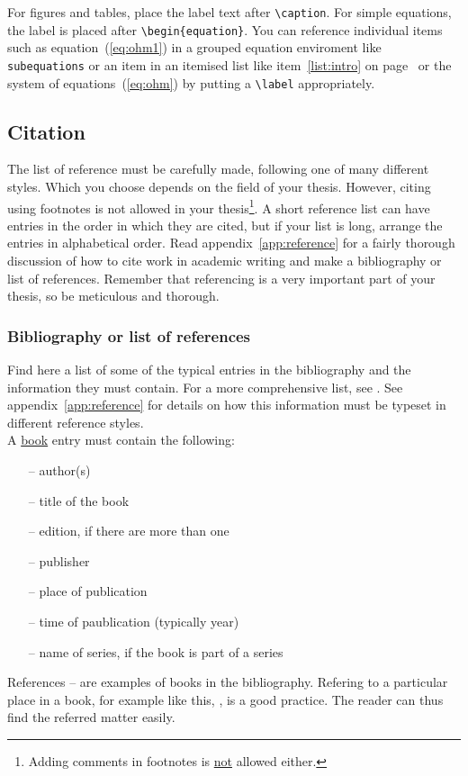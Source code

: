\documentclass[english, 12pt, a4paper, elec, utf8, a-2b, online]{aaltothesis}
\begin{document}
For figures and tables, place the label text after \verb+\caption+. For simple 
equations, the label is placed after \verb+\begin{equation}+. You can reference
individual items such as equation~(\ref{eq:ohm1}) in a grouped equation 
enviroment like \verb+subequations+ or an item in an itemised list like 
item~\ref{list:intro} on page~\pageref{list:intro} or the system of 
equations~(\ref{eq:ohm}) by putting a \verb+\label+ appropriately.

\subsection{Citation}

The list of reference must be carefully made, following one of many different 
styles. Which you choose depends on the field of your thesis. However, citing 
using footnotes is not allowed in your thesis\footnote{Adding comments in 
footnotes is \underline{not} allowed either.}. A short reference list can have 
entries in the order in which they are cited, but if your list is long, arrange 
the entries in alphabetical order. Read appendix~\ref{app:reference} for a 
fairly thorough discussion of how to cite work in academic writing and make a 
bibliography or list of references. Remember that referencing is a very 
important part of your thesis, so be meticulous and thorough.

\subsubsection{Bibliography or list of references}

Find here a list of some of the typical entries in the bibliography and the 
information they must contain. For a more comprehensive list, see 
\cite{aaltolib}. See appendix~\ref{app:reference} for details on how this 
information must be typeset in different reference styles.\\

\noindent
A \underline{book} entry must contain the following:
\begin{itemize}
\setlength{\itemsep}{-3pt}
\item[--]author(s) 
\item[--]title of the book
\item[--]edition, if there are more than one
\item[--]publisher
\item[--]place of publication
\item[--]time of paublication (typically year)
\item[--]name of series, if the book is part of a series
\end{itemize}
References \cite{Kauranen}--\cite{Koblitz} are examples of books in the 
bibliography. Refering to a particular place in a book, for example like this, 
\cite[s.\ 83--124]{Koblitz}, is a good practice. The reader can thus find the 
referred matter easily.\\
\end{document}
